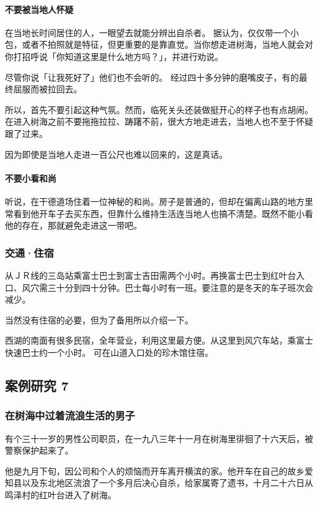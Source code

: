 \documentclass[UTF8]{ctexart}
\begin{document}
\paragraph*{不要被当地人怀疑}

在当地长时间居住的人，一眼望去就能分辨出自杀者。
据认为，仅仅带一个小包，或者不拍照就是特征，但更重要的是靠直觉。当你想走进树海，当地人就会对你打招呼说「你知道这里是什么地方吗？」，并进行劝说。

尽管你说「让我死好了」他们也不会听的。
经过四十多分钟的磨嘴皮子，有的最终屈服而被拉回去。

所以，首先不要引起这种气氛。然而，临死关头还装做挺开心的样子也有点胡闹。
在进入树海之前不要拖拖拉拉、踌躇不前，很大方地走进去，当地人也不至于怀疑跟了过来。

因为即使是当地人走进一百公尺也难以回来的，这是真话。

\paragraph*{不要小看和尚}

听说，在干德道场住着一位神秘的和尚。房子是普通的，但却在偏离山路的地方里常看到他开车子去买东西，但靠什么维持生活连当地人也搞不清楚。既然不能小看他的存在，那就避免走进这一带吧。

\subsubsection*{交通·住宿}

从ＪＲ线的三岛站乘富士巴士到富士吉田需两个小时。再换富士巴士到红叶台入口、风穴需三十分到四十分钟。巴士每小时有一班。要注意的是冬天的车子班次会减少。

当然没有住宿的必要，但为了备用所以介绍一下。

西湖的南面有很多民宿，全年营业，利用这里最方便。从这里到风穴车站，乘富士快速巴士约一个小时。
可在山道入口处的珍木馆住宿。

\subsection{案例研究 7}
\subsubsection*{在树海中过着流浪生活的男子}

有个三十一岁的男性公司职员，在一九八三年十一月在树海里徘徊了十六天后，被警察保护起来了。

他是九月下旬，因公司和个人的烦恼而开车离开横滨的家。他开车在自己的故乡爱知县以及东北地区流浪了一个多月后决心自杀，给家属寄了遗书，十月二十六日从鸣泽村的红叶台进入了树海。
\end{document}
